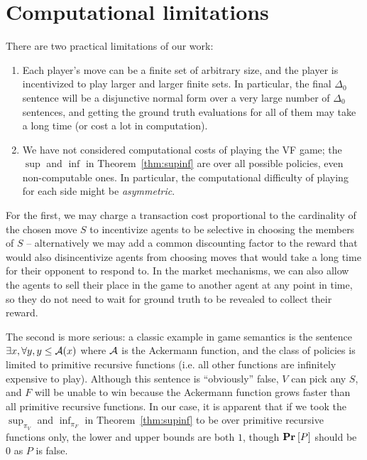 \section{Computational limitations}
\label{vf/sec:complexity}

There are two practical limitations of our work:
\begin{enumerate}
  \item Each player's move can be a finite set of arbitrary size, and the player is incentivized to play larger and larger finite sets. In particular, the final $\Delta_0$ sentence will be a disjunctive normal form over a very large number of $\Delta_0$ sentences, and getting the ground truth evaluations for all of them may take a long time (or cost a lot in computation).
  \item We have not considered computational costs of playing the VF game; the $\sup$ and $\inf$ in Theorem~\ref{thm:supinf} are over all possible policies, even non-computable ones. In particular, the computational difficulty of playing for each side might be \emph{asymmetric}.
\end{enumerate}

For the first, we may charge a transaction cost proportional to the cardinality of the chosen move $S$ to incentivize agents to be selective in choosing the members of $S$ -- alternatively we may add a common discounting factor to the reward that would also disincentivize agents from choosing moves that would take a long time for their opponent to respond to. In the market mechanisms, we can also allow the agents to sell their place in the game to another agent at any point in time, so they do not need to wait for ground truth to be revealed to collect their reward.


The second is more serious: a classic example in game semantics \cite{solovievVerifierFalsifierGamesRestrictions2022} is the sentence $\exists x,\forall y,y\le\mathcal{A}(x)$ where $\mathcal{A}$ is the Ackermann function, and the class of policies is limited to primitive recursive functions (i.e. all other functions are infinitely expensive to play). Although this sentence is ``obviously'' false, $V$ can pick any $S$, and $F$ will be unable to win because the Ackermann function grows faster than all primitive recursive functions. In our case, it is apparent that if we took the $\sup_{\pi_V}$ and $\inf_{\pi_F}$ in Theorem~\ref{thm:supinf} to be over primitive recursive functions only, the lower and upper bounds are both $1$, though $\VFPAPERProb{P}$ should be 0 as $P$ is false.

